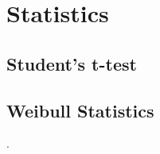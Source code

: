 

\chapter{Statistics}

\section{Student's t-test}
\lipsum
\section{Weibull Statistics}
\label{app:weibull}.

\lipsum
